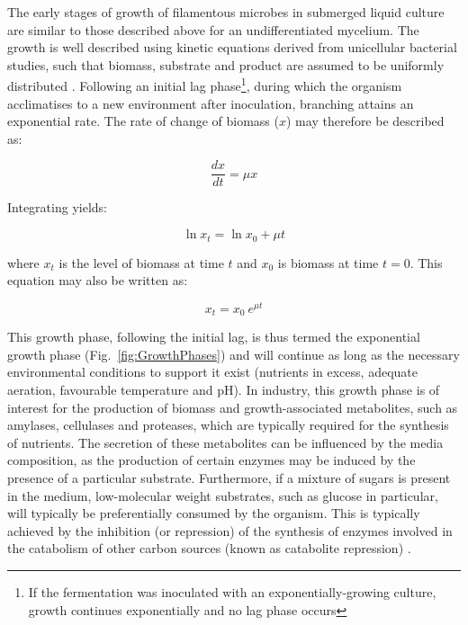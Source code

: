 The early stages of growth of filamentous microbes in submerged liquid culture are similar to those described above for an undifferentiated mycelium. The growth is well described using kinetic equations derived from unicellular bacterial studies, such that biomass, substrate and product are assumed to be uniformly distributed \cite{prosser1995}. Following an initial lag phase\footnote{If the fermentation was inoculated with an exponentially-growing culture, growth continues exponentially and no lag phase occurs}, during which the organism acclimatises to a new environment after inoculation, branching attains an exponential rate. The rate of change of biomass ($x$) may therefore be described as:

\begin{equation}
	 \frac{dx}{dt} = \mu x 
\end{equation}

\noindent Integrating yields:

\begin{equation}
	 \ln x_t = \ln x_0 + \mu t 
\end{equation}

\noindent where $x_t$ is the level of biomass at time $t$ and $x_0$ is biomass at time $t=0$. This equation may also be written as:

\begin{equation}
	 x_t = x_0 \ e^{\mu t} 
\end{equation}

\noindent This growth phase, following the initial lag, is thus termed the exponential growth phase (Fig.~\ref{fig:GrowthPhases}) and will continue as long as the necessary environmental conditions to support it exist (nutrients in excess, adequate aeration, favourable temperature and pH). In industry, this growth phase is of interest for the production of biomass and growth-associated metabolites, such as amylases, cellulases and proteases, which are typically required for the synthesis of nutrients. The secretion of these metabolites can be influenced by the media composition, as the production of certain enzymes may be induced by the presence of a particular substrate. Furthermore, if a mixture of sugars is present in the medium, low-molecular weight substrates, such as glucose in particular, will typically be preferentially consumed by the organism. This is typically achieved by the inhibition (or repression) of the synthesis of enzymes involved in the catabolism of other carbon sources (known as catabolite repression) \cite{moore-landecker1996}.

